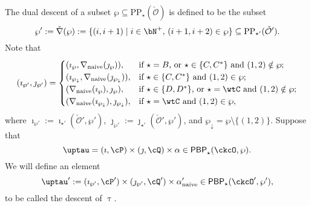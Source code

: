 \documentclass[12pt]{amsart}
\def\subset{\subseteq}
\newcommand{\CO}{{\mathcal {O}}}
\def\DD{\nabla}
\numberwithin{equation}{section}
\theoremstyle{remark}
\def\DD{\nabla}
\def\PBP{\mathsf{PBP}}
\def\ckcOp{\ckcO'}
\def\PBPs{\mathsf{PBP}_{\star}}
\def\PBPop#1#2#3#4{\PBP_{#1}^{#2}(#3,#4)}
\newcommand{\PBPOP}[1][]{\PBPop{\star}{#1}{\ckcO}{\wp}}
\def\wpm{\wp_{\downarrow}}
\def\tnaive{\mathrm{naive}}
\def\imathwpp{\imath_{\wp'}}
\def\jmathwpp{\jmath_{\wp'}}
\def\tauwpp{\tau'_{\wp'}}
\def\alphapn{\alpha'_{\tnaive}}
\def\ckDD{{\check\DD}}
\def\DD{\nabla}
\begin{document}
The dual descent of a subset $\wp\subset \mathrm{PP}_{\star}(\check \CO)$ is defined to be the subset
\begin{equation*}\label{eq:DD.wp}
  \wp':=\ckDD(\wp):=\{(i,i+1)\mid i\in \bN^+, \, (i+1, i+2)\in \wp \}\subset \mathrm{PP}_{\star'}(\check \CO').
\end{equation*}
Note that
\[
 (\imath_{\wp'}, \jmath_{\wp'})=\begin{cases}
    (\imath_\wp, \nabla_{\mathrm{naive}}(\jmath_{\wp})), & \textrm{if $\star=B$, or $\star\in\{C, C^*\}$ and $(1,2)\notin \wp$;} \\
    ( \imath_{\wpm},  \nabla_{\mathrm{naive}}(\jmath_{\wpm})), & \textrm{if $\star\in \{C, C^*\}$ and $(1,2)\in \wp$}; \\
        ( \nabla_{\mathrm{naive}}(\imath_{\wp}),\jmath_{\wp}), & \textrm{if $\star\in \{D, D^*\}$, or $\star=\wtC$ and $(1,2)\notin \wp$}; \\
          ( \nabla_{\mathrm{naive}}(\imath_{\wpm}),\jmath_{\wpm}), & \textrm{if  $\star=\wtC$ and $(1,2)\in \wp$}, \\
 \end{cases}
\]
where $\imath_{\wp'}:=\imath_{\star'}(\check \CO', \wp')$, $\jmath_{\wp'}:=\jmath_{\star'}(\check \CO', \wp')$, and $\wpm=\wp\setminus \{(1,2)\}$.
%
Suppose that
\[
\uptau=(\imath,\cP)\times(\jmath,\cQ)\times \alpha \in  \PBPOP.
\]
We will define an element
\[
  \uptau' := (\imathwpp, \cP')\times (\jmathwpp, \cQ')\times \alphapn \in \PBPs(\ckcOp,\wp'),
\]
to be called the descent of $\uptau$.

\medskip
\end{document}

